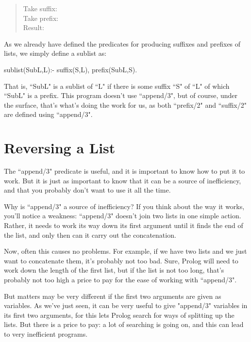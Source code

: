 \begin{quote}
Take suffix: \\[3mm]
Take prefix: \hspace*{23mm}\\[3mm]
Result:     \hspace*{31mm}
\end{quote}


As we already have defined the predicates for producing suffixes and prefixes
of lists, we simply define a sublist as:
\begin{LPNcodedisplay}
sublist(SubL,L):- suffix(S,L), prefix(SubL,S).
\end{LPNcodedisplay}
That is, ``SubL" is a sublist of ``L" if there is some suffix ``S" of ``L"
of which ``SubL" is a prefix.  This program doesn't
 use ``append/3", but of course, under the surface,
that's what's doing the work for us, as both ``prefix/2" and ``suffix/2" are
defined using ``append/3".




\section{Reversing a List}\label{SEC.L6.REVERSE}

The ``append/3" predicate is useful, and it is important to know how to
put it to work. But it is just as important to know that it can be a
source of inefficiency, and that you probably don't want to use it all
the time.

Why is ``append/3" a source of inefficiency?  If you think about
the way it works, you'll notice a weakness: ``append/3" doesn't join
two lists in one simple action. Rather, it needs to work its way down
its first argument until it finds the end of the list, and only then
can it carry out the concatenation.

Now, often this causes no problems. For example, if we have two lists
and we just want to concatenate them, it's probably not too bad. Sure,
Prolog will need to work down the length of the first list, but if the
list is not too long, that's probably not too high a price
to pay for the ease of working with ``append/3".

But matters may be very different if the first two arguments are given
as variables. As we've just seen, it can be very useful to give
"append/3" variables in its first two arguments, for this lets
Prolog search for ways of splitting up the lists. But there is a price
to pay: a lot of searching is going on, and this can lead to very
inefficient programs.

